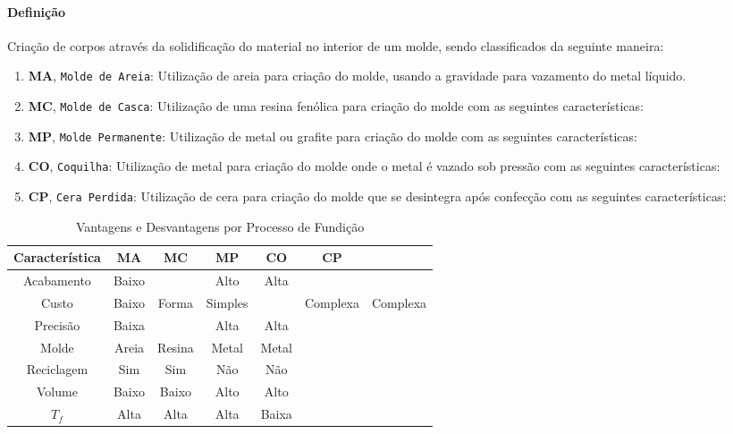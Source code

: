 \documentclass{article}
\begin{document}
            \paragraph{Definição}Criação de corpos através da solidificação do material no interior de um molde, sendo classificados da seguinte maneira:
                \begin{enumerate}[rightmargin = \leftmargin]
                    \item \textbf{MA}, \texttt{Molde de Areia}: Utilização de areia para criação do molde, usando a gravidade para vazamento do metal líquido.

                    \item \textbf{MC}, \texttt{Molde de Casca}: Utilização de uma resina fenólica para criação do molde com as seguintes características:

                    \item \textbf{MP}, \texttt{Molde Permanente}: Utilização de metal ou grafite para criação do molde com as seguintes características:

                    \item \textbf{CO}, \texttt{Coquilha}: Utilização de metal para criação do molde onde o metal é vazado sob pressão com as seguintes características:

                    \item \textbf{CP}, \texttt{Cera Perdida}: Utilização de cera para criação do molde que se desintegra após confecção com as seguintes características:
                \end{enumerate}

                \begin{table}[H]
                    \centering
                    \begin{tabular}[]{c | c c c c c}\hline
                        Característica & MA      & MC     & MP       & CO       & CP\\\hline
                        Acabamento     & Baixo   &        & Alto     & Alta     &   \\
                        Custo          & Baixo   &
                        Forma          & Simples &        & Complexa & Complexa &   \\
                        Precisão       & Baixa   &        & Alta     & Alta     &   \\
                        Molde          & Areia   & Resina & Metal    & Metal    &   \\
                        Reciclagem     & Sim     & Sim    & Não      & Não      &   \\
                        Volume         & Baixo   & Baixo  & Alto     & Alto     &   \\\hline
                        $T_{f}$        & Alta    & Alta   & Alta     & Baixa    &   \\\hline
                    \end{tabular}
                    \caption{Vantagens e Desvantagens por Processo de Fundição}
                \end{table}
\end{document}
